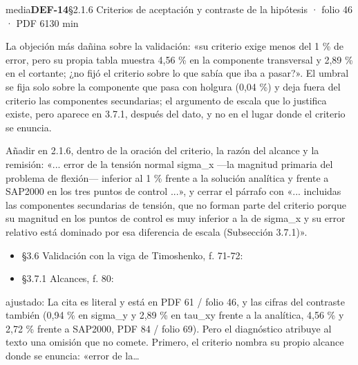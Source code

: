\begin{ficha}{media}{\casilla\textbf{DEF-14}\quad{}\quad §2.1.6 Criterios de aceptación y contraste de la hipótesis · folio 46 · PDF 61\hfill 30 min}
\par
{}La objeción más dañina sobre la validación: «su criterio exige menos del 1 \% de error, pero su propia tabla muestra 4,56 \% en la componente transversal y 2,89 \% en el cortante; ¿no fijó el criterio sobre lo que sabía que iba a pasar?». El umbral se fija solo sobre la componente que pasa con holgura (0,04 \%) y deja fuera del criterio las componentes secundarias; el argumento de escala que lo justifica existe, pero aparece en 3.7.1, después del dato, y no en el lugar donde el criterio se enuncia.\par
{}Añadir en 2.1.6, dentro de la oración del criterio, la razón del alcance y la remisión: «... error de la tensión normal sigma\_\allowbreak{}x —la magnitud primaria del problema de flexión— inferior al 1 \% frente a la solución analítica y frente a SAP2000 en los tres puntos de control ...», y cerrar el párrafo con «... incluidas las componentes secundarias de tensión, que no forman parte del criterio porque su magnitud en los puntos de control es muy inferior a la de sigma\_\allowbreak{}x y su error relativo está dominado por esa diferencia de escala (Subsección 3.7.1)».\par
{}\begin{itemize}[leftmargin=1.2em,itemsep=1pt,topsep=1pt]
\item {\small §3.6 Validación con la viga de Timoshenko, f. 71-72: }
\item {\small §3.7.1 Alcances, f. 80: }
\end{itemize}
{\footnotesize\color{gris}ajustado: La cita es literal y está en PDF 61 /\allowbreak{} folio 46, y las cifras del contraste también (0,94 \% en sigma\_\allowbreak{}y y 2,89 \% en tau\_\allowbreak{}xy frente a la analítica, 4,56 \% y 2,72 \% frente a SAP2000, PDF 84 /\allowbreak{} folio 69). Pero el diagnóstico atribuye al texto una omisión que no comete. Primero, el criterio nombra su propio alcance donde se enuncia: «error de la…\par}
\end{ficha}
